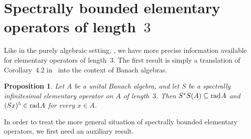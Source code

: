 \documentclass[a4paper,12pt,reqno]{amsart}
\numberwithin{equation}{section}
\newtheorem{prop}[thm]{Proposition}
\theoremstyle{definition}
\begin{document}
\section{Spectrally bounded elementary operators of length~$3$}\label{sect:length3}

\noindent
Like in the purely algebraic setting, \cite{NaMa13},
we have more precise information available for elementary operators of length~$3$. The first result is simply a translation
of Corollary~4.2 in~\cite{NaMa13} into the context of Banach algebras.

\begin{prop}
Let $A$ be a unital Banach algebra, and let ${S}$ be a spectrally infinitesimal elementary operator on $A$ of length~$3$.
Then ${S}^* {S} (A) \subseteq{{\textup{rad}\kern.7pt A}}$ and $(Sx)^5 \in {{\textup{rad}\kern.7pt A}}$ for every $x \in A$.
\end{prop}

In order to treat the more general situation of spectrally bounded elementary operators,
we first need an auxiliary result.
\end{document}
